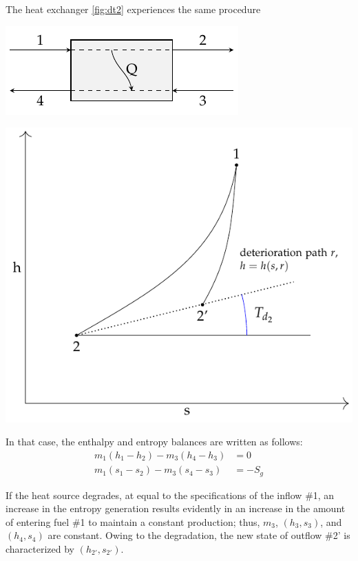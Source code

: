 \documentclass[energies,article,submit,moreauthors,pdftex]{Definitions/mdpi}
\begin{document}
The heat exchanger \cref{fig:dt2} experiences the same procedure  
\begin{center}
	\begin{minipage}[c]{0.38\linewidth}
		\centering
		\includegraphics{heater}
	\end{minipage}
	\begin{minipage}[c]{0.58\linewidth}
		\centering
		\includegraphics[scale=0.8]{dt2}
	\end{minipage}
	\label{fig:dt2}
\end{center}

In that case, the enthalpy and entropy balances are written as follows: 
\begin{align}
m_1 \left(h_1 - h_2 \right) - m_3 \left(h_4 -h_3\right) &= 0 \\
m_1 \left(s_1 - s_2 \right) - m_3 \left(s_4 - s_3 \right) &= -S_g 
\end{align}

If the heat source degrades, at equal to the specifications of the inflow \#1, an increase in the entropy generation results evidently in an increase in the amount of entering fuel \#1 to maintain a constant production; thus, $m_3$, $(h_3, s_3)$, and $(h_4, s_4)$ are constant. Owing to the degradation, the new state of outflow \#2' is characterized by $(h_{2'}, s_{2'})$.   
\end{document}
